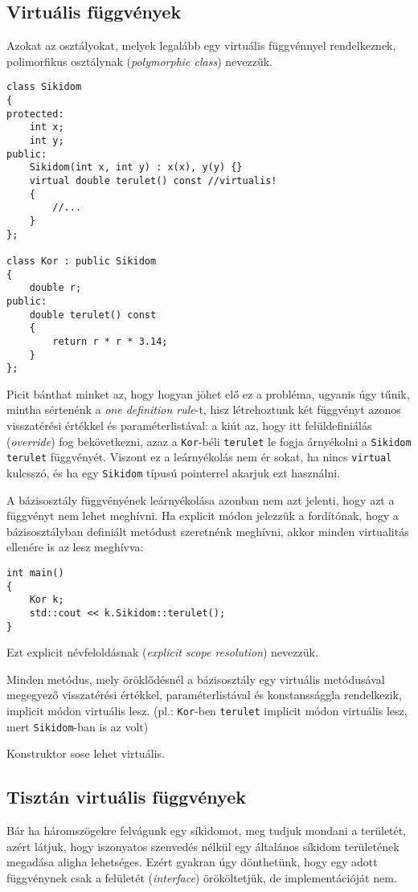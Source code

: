 \documentclass[a4paper,11.5pt]{article}
\begin{document}
	\subsection{Virtuális függvények}
	Azokat az osztályokat, melyek legalább egy virtuális függvénnyel rendelkeznek, polimorfikus osztálynak (\textit{polymorphic class}) nevezzük.
\begin{lstlisting}
class Sikidom
{
protected:
	int x;
	int y;
public:
	Sikidom(int x, int y) : x(x), y(y) {}
	virtual double terulet() const //virtualis!
	{
		//...
	}
};

class Kor : public Sikidom
{
	double r;
public:
	double terulet() const
	{
		return r * r * 3.14;
	}
};
\end{lstlisting}
	Picit bánthat minket az, hogy hogyan jöhet elő ez a probléma, ugyanis úgy tűnik, mintha sértenénk a \textit{one definition rule}-t, hisz létrehoztunk két függvényt azonos visszatérési értékkel és paraméterlistával: a kiút az, hogy itt felüldefiniálás (\textit{override}) fog bekövetkezni, azaz a \texttt{Kor}-béli \texttt{terulet} le fogja árnyékolni a \texttt{Sikidom} \texttt{terulet} függvényét. Viszont ez a leárnyékolás nem ér sokat, ha nincs \texttt{virtual} kulcsszó, és ha egy \texttt{Sikidom} típusú pointerrel akarjuk ezt használni.
	
	A bázisosztály függvényének leárnyékolása azonban nem azt jelenti, hogy azt a függvényt nem lehet meghívni. Ha explicit módon jelezzük a fordítónak, hogy a bázisosztályban definiált metódust szeretnénk meghívni, akkor minden virtualitás ellenére is az lesz meghívva:
	\begin{lstlisting}
int main()
{
	Kor k;
	std::cout << k.Sikidom::terulet();
}
	\end{lstlisting}
	Ezt explicit névfeloldásnak (\textit{explicit scope resolution}) nevezzük.
	\begin{note}
		Minden metódus, mely öröklődésnél a bázisosztály egy virtuális metódusával megegyező visszatérési értékkel, paraméterlistával és konstanssággla rendelkezik, implicit módon virtuális lesz. (pl.: \texttt{Kor}-ben \texttt{terulet} implicit módon virtuális lesz, mert \texttt{Sikidom}-ban is az volt)
	\end{note}
	Konstruktor sose lehet virtuális.
	\subsection{Tisztán virtuális függvények}
	Bár ha háromszögekre felvágunk egy síkidomot, meg tudjuk mondani a területét, azért látjuk, hogy iszonyatos szenvedés nélkül egy általános síkidom területének megadása aligha lehetséges. Ezért gyakran úgy dönthetünk, hogy egy adott függvénynek csak a felületét (\textit{interface}) örököltetjük, de implementációját nem.
	
\end{document}

